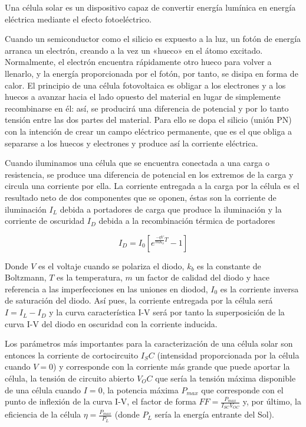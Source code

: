 Una célula solar es un dispositivo capaz de convertir energía lumínica en energía eléctrica mediante el efecto fotoeléctrico.

Cuando un semiconductor como el silicio es expuesto a la luz, un fotón de energía arranca un electrón, creando a la vez un «hueco» en el átomo excitado. Normalmente, el electrón encuentra rápidamente otro hueco para volver a llenarlo, y la energía proporcionada por el fotón, por tanto, se disipa en forma de calor. El principio de una célula fotovoltaica es obligar a los electrones y a los huecos a avanzar hacia el lado opuesto del material en lugar de simplemente recombinarse en él: así, se producirá una diferencia de potencial y por lo tanto tensión entre las dos partes del material. Para ello se dopa el silicio (unión PN) con la intención de crear un campo eléctrico permanente, que es el que obliga a separarse a los huecos y electrones y produce así la corriente eléctrica.

Cuando iluminamos una célula que se encuentra conectada a una carga o resistencia, se produce una diferencia de potencial en los extremos de la carga y circula una corriente por ella. La corriente entregada a la carga por la célula es el resultado neto de dos componentes que se oponen, éstas son la corriente de iluminación $I_L$ debida a portadores de carga que produce la iluminación y la corriente de oscuridad $I_D$ debida a la recombinación térmica de portadores

\begin{equation}
	I_D = I_0 \left[ e^{\frac{-qV}{mK_b}T} - 1 \right]
\end{equation}

Donde $V$ es el voltaje cuando se polariza el diodo, $k_b$ es la constante de Boltzmann, $T$ es la temperatura, $m$ un factor de calidad del diodo y hace referencia a las imperfecciones en las uniones en diodod, $I_0$ es la corriente inversa de saturación del diodo. Así pues, la corriente entregada por la célula será $I = I_L - I_D$ y la curva característica I-V será por tanto la superposición de la curva I-V del diodo en oscuridad con la corriente inducida.

Los parámetros más importantes para la caracterización de una célula solar son entonces la corriente de cortocircuito $I_SC$ (intensidad proporcionada por la célula cuando $V=0$) y corresponde con la corriente más grande que puede aportar la célula, la tensión de circuito abierto $V_OC$ que sería la tensión máxima disponible de una célula cuando $I=0$, la potencia máxima $P_{max}$ que corresponde con el punto de inflexión de la curva I-V, el factor de forma $FF = \frac{P_{max}}{I_{SC}V_{OC}}$ y, por último, la eficiencia de la célula $\eta = \frac{P_{max}}{P_L}$ (donde $P_L$ sería la energía entrante del Sol).